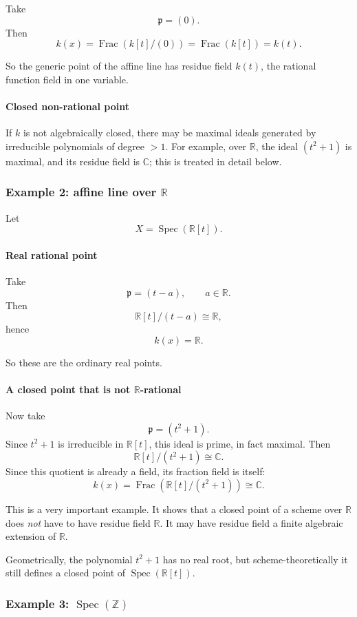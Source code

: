 \documentclass[12pt,a4paper]{article}
\theoremstyle{notespace}
\newcommand{\Spec}{\operatorname{Spec}}
\newcommand{\Frac}{\operatorname{Frac}}
\newcommand{\Z}{\mathbb Z}
\newcommand{\R}{\mathbb R}
\newcommand{\C}{\mathbb C}
\newcommand{\p}{\mathfrak p}
\theoremstyle{definition}
\begin{document}
Take
\[
\p=(0).
\]
Then
\[
k(x)=\Frac(k[t]/(0))=\Frac(k[t])=k(t).
\]

So the generic point of the affine line has residue field \(k(t)\), the rational function field in one variable.

\paragraph{Closed non-rational point}

If \(k\) is not algebraically closed, there may be maximal ideals generated by irreducible polynomials of degree \(>1\).  
For example, over \(\R\), the ideal \((t^2+1)\) is maximal, and its residue field is \(\C\); this is treated in detail below.

\subsubsection{Example 2: affine line over \(\R\)}

Let
\[
X=\Spec(\R[t]).
\]

\paragraph{Real rational point}

Take
\[
\p=(t-a),\qquad a\in \R.
\]
Then
\[
\R[t]/(t-a)\cong \R,
\]
hence
\[
k(x)=\R.
\]

So these are the ordinary real points.

\paragraph{A closed point that is not \(\R\)-rational}

Now take
\[
\p=(t^2+1).
\]
Since \(t^2+1\) is irreducible in \(\R[t]\), this ideal is prime, in fact maximal. Then
\[
\R[t]/(t^2+1)\cong \C.
\]
Since this quotient is already a field, its fraction field is itself:
\[
k(x)=\Frac(\R[t]/(t^2+1))\cong \C.
\]

This is a very important example.  
It shows that a closed point of a scheme over \(\R\) does \emph{not} have to have residue field \(\R\).  
It may have residue field a finite algebraic extension of \(\R\).

Geometrically, the polynomial \(t^2+1\) has no real root, but scheme-theoretically it still defines a closed point of \(\Spec(\R[t])\).

\subsubsection{Example 3: \(\Spec(\Z)\)}
\end{document}
